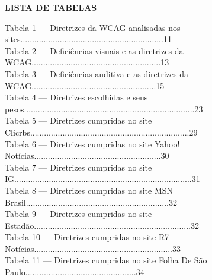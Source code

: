 \documentclass[a4paper]{article}
\begin{document}
\begin{titlepage}
	\begin{center}
		{\large \textbf{LISTA DE TABELAS}}\\[1cm]
	\end{center}
	Tabela 1 — Diretrizes da WCAG analisadas nos sites..............................................................\hspace{0.2cm}11\\[0.5cm]
	Tabela 2 — Deficiências visuais e as diretrizes da WCAG........................................................\hspace{0.2cm}13\\[0.5cm]
	Tabela 3 — Deficiências auditiva e as diretrizes da WCAG......................................................\hspace{0.2cm}15\\[0.5cm]
	Tabela 4 — Diretrizes escolhidas e seus pesos..........................................................................\hspace{0.2cm}23\\[0.5cm]
	Tabela 5 — Diretrizes cumpridas no site Clicrbs.....................................................................\hspace{0.2cm}29\\[0.5cm]
	Tabela 6 — Diretrizes cumpridas no site Yahoo! Notícias.......................................................\hspace{0.2cm}30\\[0.5cm]
	Tabela 7 — Diretrizes cumpridas no site IG.............................................................................\hspace{0.2cm}31\\[0.5cm]
	Tabela 8 — Diretrizes cumpridas no site MSN Brasil..............................................................\hspace{0.2cm}32\\[0.5cm]
	Tabela 9 — Diretrizes cumpridas no site Estadão....................................................................\hspace{0.2cm}32\\[0.5cm]
	Tabela 10 — Diretrizes cumpridas no site R7 Notícias............................................................\hspace{0.2cm}33\\[0.5cm]
	Tabela 11 — Diretrizes cumpridas no site Folha De São Paulo................................................\hspace{0.2cm}34\\[0.5cm]

\end{titlepage}
\end{document}
